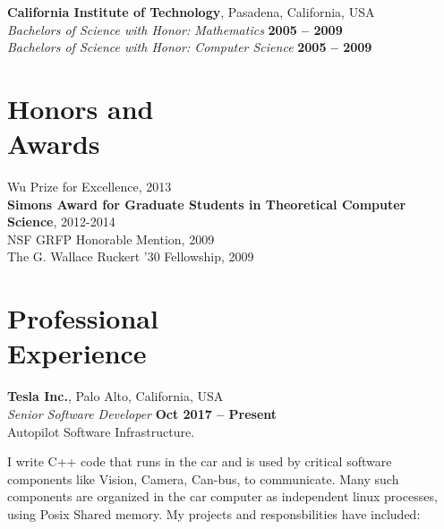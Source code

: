 \documentclass[margin,line]{resume}
\begin{document}
\begin{resume}
    \textbf{California Institute of Technology}, Pasadena, California, USA \vspace{2mm}\\\vspace{1mm}%
    \textsl{Bachelors of Science with Honor: Mathematics} \hfill \textbf{ 2005 -- 2009}\\
    \textsl{Bachelors of Science with Honor: Computer Science} \hfill \textbf{ 2005 -- 2009}\vspace{-3mm}\\%

    \section{\mysidestyle Honors and\\Awards} 

    Wu Prize for Excellence, 2013 \vspace{1mm}\\
    {\bf Simons Award for Graduate Students in Theoretical Computer Science}, 2012-2014		    \vspace{1mm}\\
    NSF GRFP Honorable Mention, 2009								    \vspace{1mm}\\%
    The G. Wallace Ruckert '30 Fellowship, 2009 						    \vspace{1mm}\\%
    
    \section{\mysidestyle Professional\\Experience}

    \textbf{Tesla Inc.}, Palo Alto, California, USA \vspace{2mm}\\\vspace{1mm}%
    \textsl{Senior Software Developer} \hfill \textbf{Oct 2017 -- Present}\\
    Autopilot Software Infrastructure.
    
    I write C++ code that runs in the car and is used by critical software components like
    Vision, Camera, Can-bus, to communicate. Many such components are organized
    in the car computer as independent linux processes, using Posix Shared memory.
    My projects and responsbilities have included:


\end{resume}
\end{document}
